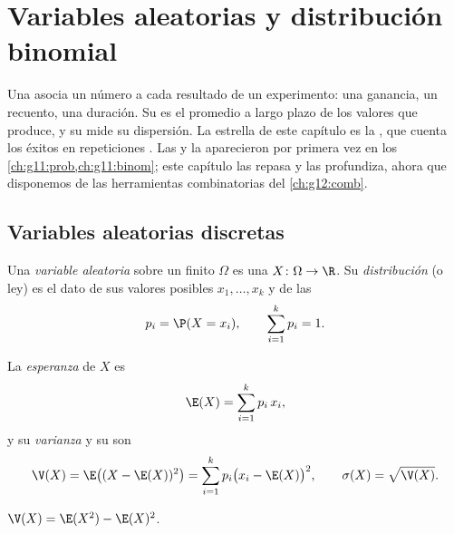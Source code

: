 \chapter{Variables aleatorias y distribución binomial}\label{ch:g12:randvar}

Una  asocia un número a cada resultado de un
experimento: una ganancia, un recuento, una duración. Su  es el
promedio a largo plazo de los valores que produce, y su  mide su
dispersión. La estrella de este capítulo es la , que
cuenta los éxitos en repeticiones . Las 
y la  aparecieron por primera vez en los
\cref{ch:g11:prob,ch:g11:binom}; este capítulo las repasa y las profundiza,
ahora que disponemos de las herramientas combinatorias del
\cref{ch:g12:comb}.

\section{Variables aleatorias discretas}

\begin{definition}\label{def:g12:randvar:rv}
Una \emph{variable aleatoria} sobre un  finito $\Omega$ es una  $X \colon \Omega \to \R$. Su
\emph{distribución} (o ley) es el dato de sus valores
posibles $x_1, \dots, x_k$ y de las 
\[
p_i = \P(X = x_i), \qquad \sum_{i=1}^{k} p_i = 1 .
\]
\end{definition}

\begin{definition}\label{def:g12:randvar:exp}
La \emph{esperanza} de $X$ es
\[
\E(X) = \sum_{i=1}^{k} p_i\, x_i ,
\]
y su \emph{varianza} y su \emph{} son
\[
\V(X) = \E\bigl((X - \E(X))^2\bigr) = \sum_{i=1}^k p_i\bigl(x_i - \E(X)\bigr)^2,
\qquad
\sigma(X) = \sqrt{\V(X)} .
\]
\end{definition}

\begin{proposition}\label{prop:g12:randvar:konig}
$\V(X) = \E(X^2) - \E(X)^2$.
\end{proposition}

